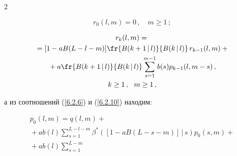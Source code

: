 \begin{multicols}{2}
\noindent


\begin{equation}


\label{6.2*.13}


r_{0}(l,m) = 0\,,


\quad m \ge 1\,;


\end{equation}





\vspace*{-9pt}





\noindent


\begin{multline}


r_{k}(l,m) ={}\\


{}=


[1 - a B(L-l-m)]


\fr{B(k+1\,|\,l)}{ B(k\,|\,l)}


\,r_{k-1}(l,m) +{}\\


{}+ a \fr{B(k+1\,|\,l) }{ B(k\,|\,l)}


\sum\limits_{s=1}^{m-1}


b(s) p_{k-1}(l,m-s)\,,


\\


 k\ge 1\,,


\ \ m \ge 1\,,


\label{6.2*.14}


\end{multline}




а из соотношений (\ref{6.2.6}) и (\ref{6.2.10}) находим:


\begin{multline}


p_{0}(l,m) =q(l,m) + {}\\


{}+ a b(l)


\sum\limits_{s=1}^{L-l-m}


\beta^*([1 - a B(L-s-m)]\,|\,s)


p_{0}(s,m)


 +{}


\\


{}+ a b(l) \sum\limits_{s=1}^{L-m}



\end{multline}
\end{multicols}
